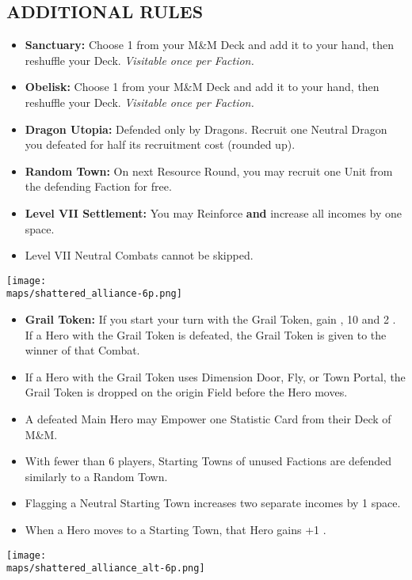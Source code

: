 \begin{multicols*}{2}
\subsection*{\MakeUppercase{Additional Rules}}
\begin{itemize}
  \item \textbf{Sanctuary:} Choose 1  from your M\&M Deck and add it to your hand, then reshuffle your Deck. \textit{Visitable once per Faction.}
  \item \textbf{Obelisk:} Choose 1  from your M\&M Deck and add it to your hand, then reshuffle your Deck. \textit{Visitable once per Faction.}
  \item \textbf{Dragon Utopia:} Defended only by Dragons. Recruit one Neutral Dragon you defeated for half its recruitment cost (rounded up).
  \item \textbf{Random Town:} On next Resource Round, you may recruit one Unit from the defending Faction for free.
  \item \textbf{Level VII Settlement:} You may Reinforce \textbf{and} increase all incomes by one space.
  \item Level VII Neutral Combats cannot be skipped.
\end{itemize}

\begin{center}
  \vspace*{\fill}
  \texttt{[image: \\maps/shattered\_alliance-6p.png]}
  \vspace*{\fill}
\end{center}

\columnbreak

\begin{itemize}
  \item \textbf{Grail Token:} If you start your turn with the Grail Token, gain , 10  and 2 . If a Hero with the Grail Token is defeated, the Grail Token is given to the winner of that Combat.
  \item If a Hero with the Grail Token uses Dimension Door, Fly, or Town Portal, the Grail Token is dropped on the origin Field before the Hero moves.
  \item A defeated Main Hero may Empower one Statistic Card from their Deck of M\&M.
  \item With fewer than 6 players, Starting Towns of unused Factions are defended similarly to a Random Town.
  \item Flagging a Neutral Starting Town increases two separate incomes by 1 space.
  \item When a Hero moves to a Starting Town, that Hero gains +1 .
\end{itemize}

\vspace*{\fill}

\begin{center}
  \texttt{[image: \\maps/shattered\_alliance\_alt-6p.png]}
  \vspace*{\fill}
\end{center}

\end{multicols*}
